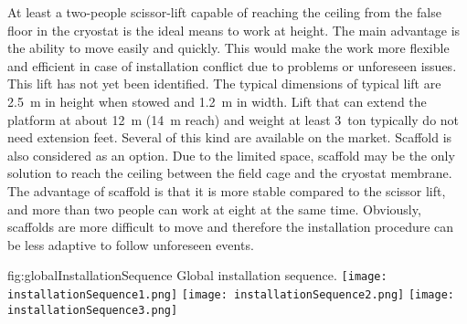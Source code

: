 At least a two-people scissor-lift capable of reaching the ceiling from the false floor in the cryostat is the ideal means to work at height.
The main advantage is the ability to move easily and quickly.
This would make the work more flexible and efficient in case of installation conflict due to problems or unforeseen issues.
This lift has not yet been identified.
The typical dimensions of typical lift are 2.5~m in height when stowed and 1.2~m in width.
Lift that can extend the platform at about 12~m (14~m reach) and weight at least 3~ton typically do not need extension feet.
Several of this kind are available on the market.
Scaffold is also considered as an option.
Due to the limited space, scaffold may be the only solution to reach the ceiling between the field cage and the cryostat membrane.
The advantage of scaffold is that it is more stable compared to the scissor lift, and more than two people can work at eight at the same time.
Obviously, scaffolds are more difficult to move and therefore the installation procedure can be less adaptive to follow unforeseen events.

\begin{dunefigure}{fig:globalInstallationSequence}
{Global installation sequence.}
\texttt{[image: installationSequence1.png]}
\texttt{[image: installationSequence2.png]}
\texttt{[image: installationSequence3.png]}
\end{dunefigure}

